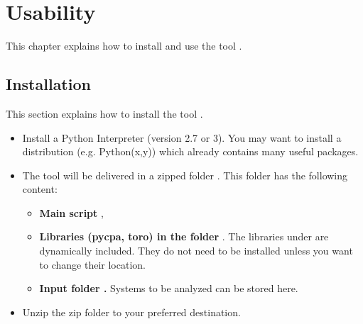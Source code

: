 \section{Usability}
\label{sec:usability}
This chapter explains how to install and use the tool \Tool.

\subsection{Installation}
This section explains how to install the tool \Tool.
\begin{itemize}[leftmargin=*]
	\item Install a Python Interpreter (version 2.7 or 3).
				You may want to install a distribution (e.g. Python(x,y)) which already contains many useful packages.
	\item The tool \Tool will be delivered in a zipped folder . 
				This folder has the following content:
				\begin{itemize}
				\item \textbf{Main script }, 
				\item \textbf{Libraries (pycpa, toro) in the folder }.
				The libraries under  are dynamically included. 
				They do not need to be installed unless you want to change their location.
				\item \textbf{Input folder .} Systems to be analyzed can be stored here.
				\end{itemize}
	\item Unzip the zip folder to your preferred destination.	
\end{itemize}


